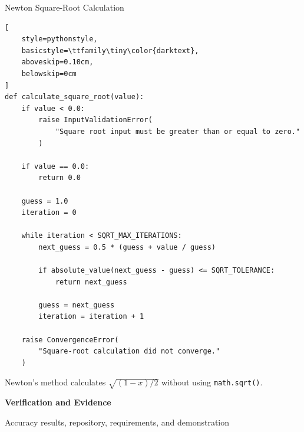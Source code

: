 \documentclass[aspectratio=169]{beamer}
\begin{document}
\begin{frame}[fragile]{Newton Square-Root Calculation}

\begin{lstlisting}[
    style=pythonstyle,
    basicstyle=\ttfamily\tiny\color{darktext},
    aboveskip=0.10cm,
    belowskip=0cm
]
def calculate_square_root(value):
    if value < 0.0:
        raise InputValidationError(
            "Square root input must be greater than or equal to zero."
        )

    if value == 0.0:
        return 0.0

    guess = 1.0
    iteration = 0

    while iteration < SQRT_MAX_ITERATIONS:
        next_guess = 0.5 * (guess + value / guess)

        if absolute_value(next_guess - guess) <= SQRT_TOLERANCE:
            return next_guess

        guess = next_guess
        iteration = iteration + 1

    raise ConvergenceError(
        "Square-root calculation did not converge."
    )
\end{lstlisting}

\vspace{-0.12cm}
\scriptsize
Newton's method calculates \(\sqrt{(1-x)/2}\) without using \texttt{math.sqrt()}.
\end{frame}

\begin{frame}[plain]
\centering
\vfill
{\color{navy}\LARGE\bfseries Verification and Evidence\par}
\vspace{0.2cm}
{\large Accuracy results, repository, requirements, and demonstration\par}
\vfill
\end{frame}
\end{document}
